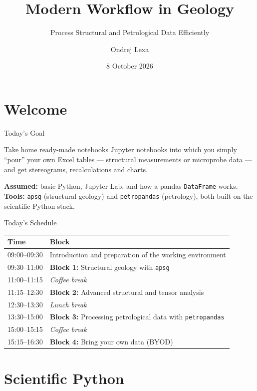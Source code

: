 \documentclass[aspectratio=169,11pt]{beamer}
\title[Modern Workflow in Geology]{Modern Workflow in Geology}
\subtitle{Process Structural and Petrological Data Efficiently}
\author[O.\ Lexa]{Ondrej Lexa}
\institute[Charles University]{
  Institute of Petrology and Structural Geology (IPSG)\\
  Charles University, Prague, Czechia
}
\date{8 October 2026}
\begin{document}
\begin{frame}[plain]
  \titlepage
\end{frame}

\section{Welcome}

\begin{frame}{Today's Goal}
  \begin{block}{Take home ready-made notebooks}
    Jupyter notebooks into which you simply ``pour'' your own Excel tables ---
    structural measurements or microprobe data --- and get stereograms,
    recalculations and charts.
  \end{block}
  \vspace{0.3cm}
  \textbf{Assumed:} basic Python, Jupyter Lab, and how a pandas
  \texttt{DataFrame} works.\\[0.2cm]
  \textbf{Tools:} \texttt{apsg} (structural geology) and \texttt{petropandas}
  (petrology), both built on the scientific Python stack.
\end{frame}

\begin{frame}{Today's Schedule}
  \centering
  \small
  \begin{tabularx}{0.92\textwidth}{lX}
    \toprule
    \textbf{Time} & \textbf{Block} \\
    \midrule
    09:00--09:30 & Introduction and preparation of the working environment \\
    09:30--11:00 & \textbf{Block 1:} Structural geology with \texttt{apsg} \\
    11:00--11:15 & \emph{Coffee break} \\
    11:15--12:30 & \textbf{Block 2:} Advanced structural and tensor analysis \\
    12:30--13:30 & \emph{Lunch break} \\
    13:30--15:00 & \textbf{Block 3:} Processing petrological data with \texttt{petropandas} \\
    15:00--15:15 & \emph{Coffee break} \\
    15:15--16:30 & \textbf{Block 4:} Bring your own data (BYOD) \\
    \bottomrule
  \end{tabularx}
\end{frame}

\section{Scientific Python}
\end{document}
